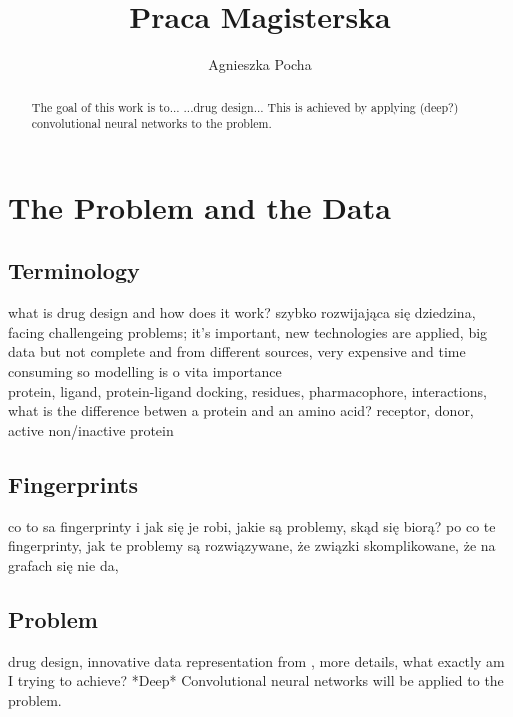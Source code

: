 \documentclass[a4paper,10pt]{report}
\title{Praca Magisterska}
\author{Agnieszka Pocha}
\begin{document}
  \maketitle
  \begin{abstract}
    The goal of this work is to... ...drug design... This is achieved by applying (deep?) convolutional neural networks to the problem.
  \end{abstract}
  \tableofcontents
  
  
  \chapter{The Problem and the Data}
    
    \section{Terminology} %
    what is drug design and how does it work? szybko rozwijająca się dziedzina, facing challengeing problems; it's important, new technologies are applied, big data but not complete and from different sources, very expensive and time consuming so modelling is o vita importance \\
    
    protein, ligand, protein-ligand docking, residues, pharmacophore, interactions, what is the difference betwen a protein and an amino acid? receptor, donor, active non/inactive protein
    
    \section{Fingerprints} %
    co to sa fingerprinty i jak się je robi, jakie są problemy, skąd się biorą? po co te fingerprinty, jak te problemy są rozwiązywane, że związki skomplikowane, że na grafach się nie da, 
  
    \section{Problem} %
    drug design, innovative data representation from \cite{2DSIFT}, more details, what exactly am I trying to achieve? *Deep* Convolutional neural networks will be applied to the problem.
    
\end{document}
